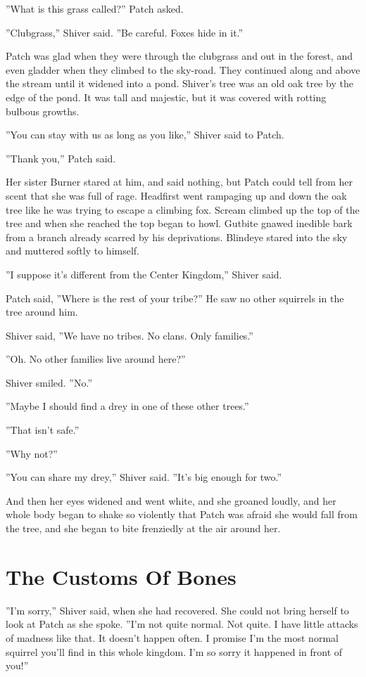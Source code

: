 \documentclass[12pt]{book}
\begin{document}
''What is this grass called?'' Patch asked.

''Clubgrass,'' Shiver said. ''Be careful. Foxes hide in it.''

Patch was glad when they were through the clubgrass and out in the forest, and even gladder when they climbed to the sky-road. They continued along and above the stream until it widened into a pond. Shiver's tree was an old oak tree by the edge of the pond. It was tall and majestic, but it was covered with rotting bulbous growths.

''You can stay with us as long as you like,'' Shiver said to Patch.

''Thank you,'' Patch said.

Her sister Burner stared at him, and said nothing, but Patch could tell from her scent that she was full of rage. Headfirst went rampaging up and down the oak tree like he was trying to escape a climbing fox. Scream climbed up the top of the tree and when she reached the top began to howl. Gutbite gnawed inedible bark from a branch already scarred by his deprivations. Blindeye stared into the sky and muttered softly to himself.

''I suppose it's different from the Center Kingdom,'' Shiver said.

Patch said, ''Where is the rest of your tribe?'' He saw no other squirrels in the tree around him.

Shiver said, ''We have no tribes. No clans. Only families.''

''Oh. No other families live around here?''

Shiver smiled. ''No.''

''Maybe I should find a drey in one of these other trees.''

''That isn't safe.''

''Why not?''

''You can share my drey,'' Shiver said. ''It's big enough for two.''

And then her eyes widened and went white, and she groaned loudly, and her whole body began to shake so violently that Patch was afraid she would fall from the tree, and she began to bite frenziedly at the air around her.


\section{The Customs Of Bones}

''I'm sorry,'' Shiver said, when she had recovered. She could not bring herself to look at Patch as she spoke. ''I'm not quite normal. Not quite. I have little attacks of madness like that. It doesn't happen often. I promise I'm the most normal squirrel you'll find in this whole kingdom. I'm so sorry it happened in front of you!''
\end{document}

